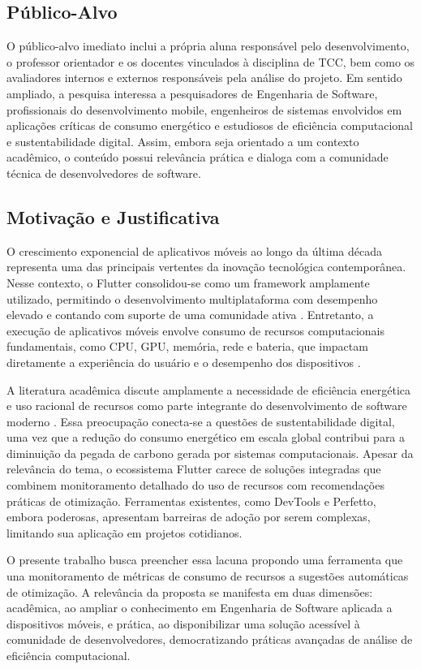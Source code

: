 \documentclass[12pt,a4paper]{article}
\begin{document}
\subsection{Público-Alvo}
O público-alvo imediato inclui a própria aluna responsável pelo desenvolvimento, o professor orientador e os docentes vinculados à disciplina de TCC, bem como os avaliadores internos e externos responsáveis pela análise do projeto. Em sentido ampliado, a pesquisa interessa a pesquisadores de Engenharia de Software, profissionais do desenvolvimento mobile, engenheiros de sistemas envolvidos em aplicações críticas de consumo energético e estudiosos de eficiência computacional e sustentabilidade digital. Assim, embora seja orientado a um contexto acadêmico, o conteúdo possui relevância prática e dialoga com a comunidade técnica de desenvolvedores de software.

\subsection{Motivação e Justificativa}
O crescimento exponencial de aplicativos móveis ao longo da última década representa uma das principais vertentes da inovação tecnológica contemporânea. Nesse contexto, o Flutter consolidou-se como um framework amplamente utilizado, permitindo o desenvolvimento multiplataforma com desempenho elevado e contando com suporte de uma comunidade ativa \cite{flutter}. Entretanto, a execução de aplicativos móveis envolve consumo de recursos computacionais fundamentais, como CPU, GPU, memória, rede e bateria, que impactam diretamente a experiência do usuário e o desempenho dos dispositivos \cite{energy, monitoring}.  

A literatura acadêmica discute amplamente a necessidade de eficiência energética e uso racional de recursos como parte integrante do desenvolvimento de software moderno \cite{mobile_energy, performance}. Essa preocupação conecta-se a questões de sustentabilidade digital, uma vez que a redução do consumo energético em escala global contribui para a diminuição da pegada de carbono gerada por sistemas computacionais. Apesar da relevância do tema, o ecossistema Flutter carece de soluções integradas que combinem monitoramento detalhado do uso de recursos com recomendações práticas de otimização. Ferramentas existentes, como DevTools e Perfetto, embora poderosas, apresentam barreiras de adoção por serem complexas, limitando sua aplicação em projetos cotidianos.  

O presente trabalho busca preencher essa lacuna propondo uma ferramenta que una monitoramento de métricas de consumo de recursos a sugestões automáticas de otimização. A relevância da proposta se manifesta em duas dimensões: acadêmica, ao ampliar o conhecimento em Engenharia de Software aplicada a dispositivos móveis, e prática, ao disponibilizar uma solução acessível à comunidade de desenvolvedores, democratizando práticas avançadas de análise de eficiência computacional.
\end{document}
